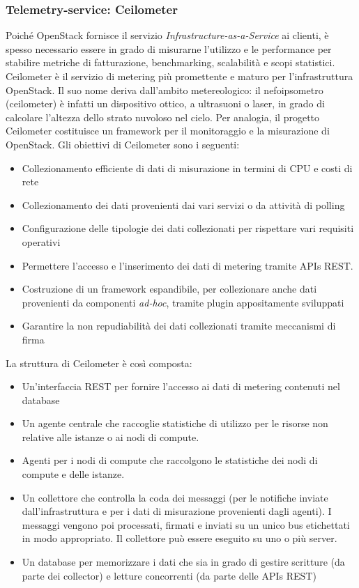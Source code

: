 \documentclass[../main.tex]{subfiles}
\begin{document}
\subsubsection{Telemetry-service: Ceilometer}
Poiché OpenStack fornisce il servizio \textit{Infrastructure-as-a-Service} ai clienti, è spesso necessario essere in grado di misurarne l'utilizzo e le performance per stabilire metriche di fatturazione, benchmarking, scalabilità e scopi statistici.
Ceilometer è il servizio di metering più promettente e maturo per l'infrastruttura OpenStack. 
Il suo nome deriva dall'ambito metereologico: il nefoipsometro (ceilometer) è infatti un dispositivo ottico, a ultrasuoni o laser, in grado di calcolare l'altezza dello strato nuvoloso nel cielo.
Per analogia, il progetto Ceilometer costituisce un framework per il monitoraggio e la misurazione di OpenStack.
Gli obiettivi di Ceilometer sono i seguenti:
\begin{itemize}
\item Collezionamento efficiente di dati di misurazione in termini di CPU e costi di rete
\item Collezionamento dei dati provenienti dai vari servizi o da attività  di polling
\item Configurazione delle tipologie dei dati collezionati per rispettare vari requisiti operativi
\item Permettere l'accesso e l'inserimento dei dati di metering tramite APIs REST.
\item Costruzione di un framework espandibile, per collezionare anche dati provenienti da componenti \textit{ad-hoc}, tramite plugin appositamente sviluppati
\item Garantire la non repudiabilità dei dati collezionati tramite meccanismi di firma
\end{itemize}
La struttura di Ceilometer è così composta:
\begin{itemize}
\item Un'interfaccia REST per fornire l'accesso ai dati di metering contenuti nel database
\item Un agente centrale che raccoglie statistiche di utilizzo per le risorse non relative alle istanze o ai nodi di compute.
\item Agenti per i nodi di compute che raccolgono le statistiche dei nodi di compute e delle istanze.
\item Un collettore che controlla la coda dei messaggi (per le notifiche inviate dall'infrastruttura e per i dati di misurazione provenienti dagli agenti).  I messaggi vengono poi processati, firmati e inviati su un unico bus etichettati in modo appropriato. Il collettore può essere eseguito su uno o più server.
\item Un database per memorizzare i dati che sia in grado di gestire scritture (da parte dei collector) e letture concorrenti (da parte delle APIs REST)
\end{itemize}
\end{document}
